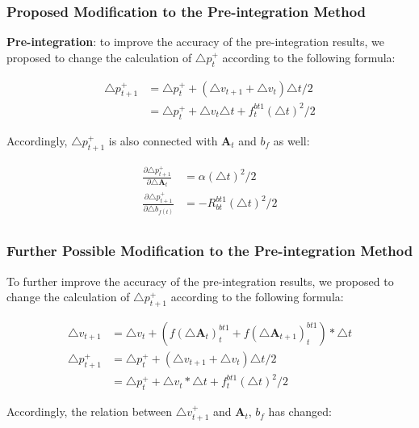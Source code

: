 \documentclass[12pt]{article}   %
\begin{document}
\subsubsection{Proposed Modification to the Pre-integration Method}

\textbf{Pre-integration}: to improve the accuracy of the pre-integration results, we proposed to change the calculation of $\triangle p_{t}^+$ according to the following formula:

\begin{align*}
\triangle p_{t+1}^+ & = \triangle p_{t}^+ + (\triangle v_{t+1} + \triangle v_t) \triangle t / 2 \\
	            & = \triangle p_{t}^+ + \triangle v_{t}  \triangle t + f_t^{bt1} {(\triangle t)}^2 / 2
\end{align*}

Accordingly, $\triangle p_{t+1}^+$ is also connected with $\textbf{A}_t$ and $b_f$ as well:

\begin{align*}
\frac{\partial \triangle p_{t+1}^+} {\partial \triangle \textbf{A} _{t}} & =  \alpha  {(\triangle t)}^2 / 2 \\
\frac{\partial \triangle p_{t+1}^+} {\partial \triangle b_{f(t)}} & =  -R_{bt}^{bt1} {(\triangle t)}^2 / 2 \\
\end{align*}

\subsubsection{Further Possible Modification to the Pre-integration Method}

To further improve the accuracy of the pre-integration results, we proposed to change the calculation of $\triangle p_{t+1}^+$ according to the following formula:

\begin{align*}
\triangle v_{t+1} & = \triangle v_{t} + (f(\triangle \textbf{A} _{t})_t^{bt1} + f(\triangle \textbf{A} _{t+1})_t^{bt1}) * \triangle t \\
\triangle p_{t+1}^+ & = \triangle p_{t}^+ + (\triangle v_{t+1} + \triangle v_t)  \triangle t / 2\\
	            & = \triangle p_{t}^+ + \triangle v_{t} * \triangle t + f_t^{bt1} {(\triangle t)}^2 / 2
\end{align*}

Accordingly, the relation between $\triangle v_{t+1}^+$ and $\textbf{A}_t$, $b_f$ has changed:
\end{document}
